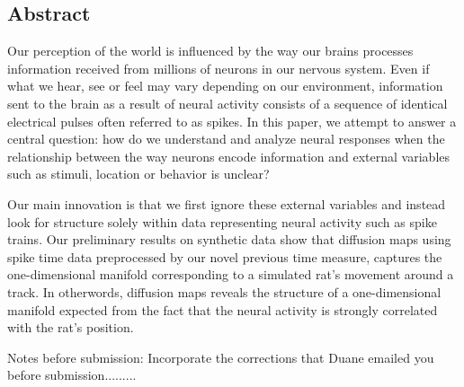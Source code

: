 
\thispagestyle{empty}

\begin{center}
    \Large
    
\section*{Abstract}


\end{center}

\vspace{1cm}


Our perception of the world is influenced by the way our brains processes information received from millions of neurons
in our nervous system. Even if what we hear, see or feel may vary depending on our environment, information sent to the brain as a result of neural activity consists of a sequence of identical electrical pulses often referred to as spikes.
In this paper, we attempt to answer a central question: how do we understand and analyze neural responses when the relationship between the way neurons encode information and external variables such as stimuli, location or behavior  is unclear?


Our main innovation is  that we  first ignore these external variables and instead look for structure solely within data representing neural activity such as spike trains. Our preliminary results on synthetic data show that diffusion maps using spike time data preprocessed by our novel previous time measure, captures the  one-dimensional manifold corresponding to a simulated rat's movement around a track. In otherwords, diffusion maps  reveals the structure of a 
one-dimensional  manifold expected from the fact that the neural activity is strongly correlated with the rat's position.




Notes before submission: Incorporate the corrections that Duane emailed you before submission.........

  \vfill





\newpage